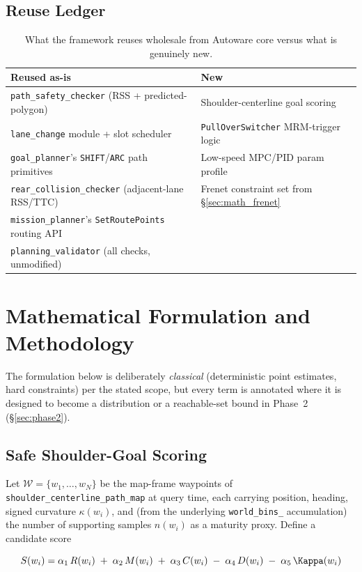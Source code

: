 \documentclass[11pt]{article}
\newcommand{\code}[1]{\texttt{#1}}
\newcommand{\pkg}[1]{\texttt{#1}}
\begin{document}
\subsection{Reuse Ledger}
\begin{table}[H]
\centering
\begin{tabular}{@{}ll@{}}
\toprule
\textbf{Reused as-is} & \textbf{New}\\
\midrule
\pkg{path\_safety\_checker} (RSS + predicted-polygon) & Shoulder-centerline goal scoring \\
\pkg{lane\_change} module + slot scheduler & \pkg{PullOverSwitcher} MRM-trigger logic \\
\code{goal\_planner}'s \code{SHIFT}/\code{ARC} path primitives & Low-speed MPC/PID param profile \\
\pkg{rear\_collision\_checker} (adjacent-lane RSS/TTC) & Frenet constraint set from \S\ref{sec:math_frenet} \\
\pkg{mission\_planner}'s \code{SetRoutePoints} routing API & \\
\pkg{planning\_validator} (all checks, unmodified) & \\
\bottomrule
\end{tabular}
\caption{What the framework reuses wholesale from Autoware core versus what is genuinely new.}
\end{table}

\section{Mathematical Formulation and Methodology}
\label{sec:math}

The formulation below is deliberately \emph{classical} (deterministic point estimates, hard
constraints) per the stated scope, but every term is annotated where it is designed to become a
distribution or a reachable-set bound in Phase~2 (\S\ref{sec:phase2}).

\subsection{Safe Shoulder-Goal Scoring}
\label{sec:math_goal}
Let $\mathcal{W} = \{w_1, \ldots, w_N\}$ be the map-frame waypoints of
\code{shoulder\_centerline\_path\_map} at query time, each carrying position, heading, signed
curvature $\kappa(w_i)$, and (from the underlying \code{world\_bins\_} accumulation) the number of
supporting samples $n(w_i)$ as a maturity proxy. Define a candidate score

\begin{equation}
\label{eq:goalscore}
S(w_i) = \alpha_1\, R(w_i) \;+\; \alpha_2\, M(w_i) \;+\; \alpha_3\, C(w_i) \;-\; \alpha_4\, D(w_i)
\;-\; \alpha_5\, \Kappa(w_i)
\end{equation}
\end{document}
